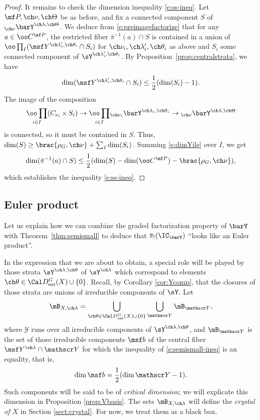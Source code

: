 \documentclass[final]{amsart}
\theoremstyle{remark}
\theoremstyle{definition}
\DeclareMathOperator*{\xt}{\times}
\numberwithin{equation}{section}
\begin{document}
\begin{proof}
It remains to check the dimension inequality \eqref{e:ss-ineq}.
Let $\mf P, \ch\nu, \ch\Theta$ be as before, and  
fix a connected component $S$ of $_{\ch\nu}\barY^{\ch\lambda,\ch\Theta}$.
We deduce from 
\eqref{e:preimagefactorize} that for any $a \in \oo C^{\mf P}$,
the restricted fiber 
$\bar\pi^{-1}(a) \cap S$
is contained in a union of 
$\oo\prod_I (\msf Y^{\ch\lambda'_i,\ch\theta_i}\cap S_i)$ for 
$\ch\nu_i,\ch\lambda'_i,\ch\theta_i$ as above
and $S_i$ some connected component of $\sY^{\ch\lambda'_i,\ch\theta_i}$. 
By Proposition~\ref{prop:centralstrata}, we have 
\begin{equation}  \label{e:dimYile}
\dim( \msf Y^{\ch\lambda'_i, \ch\theta_i} \cap S_i ) \le 
\frac 1 2 ( \dim(S_i) - 1 ).
\end{equation}
The image of the composition
\[ \underset{i\in I}{\oo\prod} (C_{\nu_i} \xt S_i) \to \underset{i\in I}{\oo\prod}
{_{\ch\nu_i} \barY^{\ch\lambda_i,\ch\theta_i} } \to {_{\ch\nu}\barY^{\ch\lambda,\ch\Theta}} \]
is connected, so it must be contained in $S$. 
Thus, $\dim(S) \ge \brac{\rho_G,\ch\nu} + \sum_I \dim(S_i)$.
Summing \eqref{e:dimYile} over $I$, we get 
\[ \dim( \bar\pi^{-1}(a) \cap S ) \le 
\frac 1 2 ( \dim(S) - \dim( \oo C^{\mf P} )- \brac{\rho_G,\ch\nu}  ), \]
which establishes the inequality \eqref{e:ss-ineq}.
\end{proof}

\subsection{Euler product}
Let us explain how we can combine the graded 
factorization property of $\barY$ with 
Theorem~\ref{thm:semismall} to deduce that 
$\bar\pi_!(\IC_{\barY})$ ``looks like an Euler product''. 

In the expression that we are about to obtain, a special role will be played by those strata $\sY^{\ch\lambda,\ch\theta}$ of $\sY^{\ch\lambda}$ which correspond to elements $\ch\theta\in \Cal D^G_{\mathrm{sat}}(X) \cup \{0\}$. Recall, by Corollary \ref{cor:Ycomp}, that the closures of those strata are unions of irreducible components of $\sY$. Let 
\begin{equation}\label{e:crystallambda} \mB_{X,\ch\lambda} = \bigcup_{\ch\theta\in \Cal D^G_{\mathrm{sat}}(X) \cup \{0\}}\bigcup_{\mathscr Y} {\mB_{\mathscr Y}},
\end{equation}
where $\mathscr Y$ runs over all irreducible components of $\sY^{\ch\lambda,\ch\theta}$, and ${\mB_{\mathscr Y}}$ is the set of those irreducible components $\msf b$ of the central fiber $\msf Y^{\ch\lambda}\cap \mathscr Y$ for which the inequality of \eqref{e:semismall-ineq} is an equality, that is, 
\begin{equation}
 \dim\msf b = \frac{1}{2} (\dim \mathscr Y-1).
\end{equation}
Such components will be said to be of \emph{critical dimension}; we will explicate this dimension in Proposition \ref{prop:Vbasis}. The sets $\mB_{X,\ch\lambda}$ will define the \emph{crystal of $X$} in Section \ref{sect:crystal}. For now, we treat them as a black box.
\end{document}
